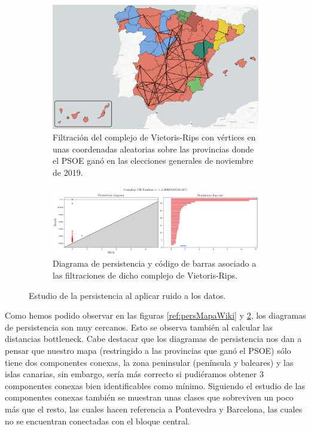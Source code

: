 \vspace*{\fill}
\newpage
\begin{figure}[!ht]
\centering
\begin{subfigure}[b]{\textwidth}
	\centering
	\includegraphics[width=\textwidth]{include/figuras/mapaRandom.png} 
	\caption{Filtración del complejo de Vietoris-Rips con vértices en unas coordenadas aleatorias sobre las provincias donde el PSOE ganó en las elecciones generales de noviembre de 2019.}
	\label{ref:mapaRandom}
\end{subfigure}
\begin{subfigure}[b]{\textwidth}
	\centering
	\includegraphics[width=\textwidth]{../code/output/ejemploMapa2.png} 
	\caption{Diagrama de persistencia y código de barras asociado a las filtraciones de dicho complejo de Vietoris-Rips.}
	\label{ref:persMapaRandom}
\end{subfigure}
\caption{Estudio de la persistencia al aplicar ruido a los datos.}
\label{ref:figMapaRandom}
\end{figure}

Como hemos podido observar en las figuras \ref{ref:persMapaWiki} y \ref{ref:persMapaRandom}, los diagramas de persistencia son muy cercanos. Esto se observa también al calcular las distancias bottleneck. Cabe destacar que los diagramas de persistencia nos dan a pensar que nuestro mapa (restringido a las provincias que ganó el PSOE) sólo tiene dos componentes conexas, la zona peninsular (península y baleares) y las islas canarias, sin embargo, sería más correcto si pudiéramos obtener 3 componentes conexas  bien identificables como mínimo. Siguiendo el estudio de las componentes conexas también se muestran unas clases que sobreviven un poco más que el resto, las cuales hacen referencia a Pontevedra y Barcelona, las cuales no se encuentran conectadas con el bloque central.

